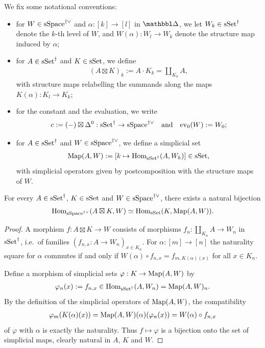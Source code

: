\documentclass[a4paper,dvipdfmx,11pt]{amsart}
\begin{document}
\begin{notation}
  We fix some notational conventions:
  \begin{itemize}
    \item for $W\in\mathrm{sSpace}^{\dag\vee}$ and $\alpha:[k]\to[l]$ in $\prism$, we let $W_k\in\mathrm{sSet}^{\dag}$ denote the $k$-th level of $W$, and $W(\alpha):W_l\to W_k$ denote the structure map induced by $\alpha$;
    \item for $A\in\mathrm{sSet}^{\dag}$ and $K\in\mathrm{sSet}$, we define
    \begin{align}
      (A\boxtimes K)_k:=A\cdot K_k=\textstyle\coprod_{K_k}A,
    \end{align}
    with structure maps relabelling the summands along the maps $K(\alpha):K_l\to K_k$;
    \item for the constant and the evaluation, we write
    \begin{align}
      c:=(-)\boxtimes\Delta^0:\mathrm{sSet}^{\dag}\to\mathrm{sSpace}^{\dag\vee}
      \quad \text{and} \quad 
      \mathrm{ev}_0(W):=W_0;
    \end{align}
    \item for $A\in\mathrm{sSet}^{\dag}$ and $W\in\mathrm{sSpace}^{\dag\vee}$, we define a simplicial set
    \begin{align}
      \operatorname{Map}(A,W):=[k\mapsto\operatorname{Hom}_{\mathrm{sSet}^{\dag}}(A,W_k)]\in\mathrm{sSet},
    \end{align}
    with simplicial operators given by postcomposition with the structure maps of $W$.
  \end{itemize}
\end{notation}

\begin{lemma}\label{cs.lem.adjunction}
  For every $A\in\mathrm{sSet}^{\dag}$, $K\in\mathrm{sSet}$ and $W\in\mathrm{sSpace}^{\dag\vee}$, there exists a natural bijection
  \begin{align}\label{cs.eq.boxtimes}
    \operatorname{Hom}_{\mathrm{sSpace}^{\dag\vee}}(A\boxtimes K,W)
    \simeq
    \operatorname{Hom}_{\mathrm{sSet}}(K,\operatorname{Map}(A,W)).
  \end{align}
\end{lemma}

\begin{proof}
  A morphism $f:A\boxtimes K\to W$ consists of morphisms $f_n:\coprod_{K_n}A\to W_n$ in $\mathrm{sSet}^{\dag}$, i.e.\ of families $(f_{n,x}:A\to W_n)_{x\in K_n}$.
  For $\alpha:[m]\to[n]$ the naturality square for $\alpha$ commutes if and only if $W(\alpha)\circ f_{n,x}=f_{m,K(\alpha)(x)}$ for all $x\in K_n$.

  Define a morphism of simplicial sets $\varphi:K\to\operatorname{Map}(A,W)$ by 
  \begin{align}
    \varphi_n(x):=f_{n,x}\in\operatorname{Hom}_{\mathrm{sSet}^{\dag}}(A,W_n)=\operatorname{Map}(A,W)_n.
  \end{align}
  By the definition of the simplicial operators of $\operatorname{Map}(A,W)$, the compatibility 
  \begin{align}
    \varphi_m(K(\alpha)(x))= \operatorname{Map}(A,W)(\alpha)(\varphi_n(x)) =W(\alpha)\circ f_{n,x}
  \end{align}
  of $\varphi$ with $\alpha$ is exactly the naturality.
  Thus $f\mapsto\varphi$ is a bijection onto the set of simplicial maps, clearly natural in $A$, $K$ and $W$.
\end{proof}
\end{document}
